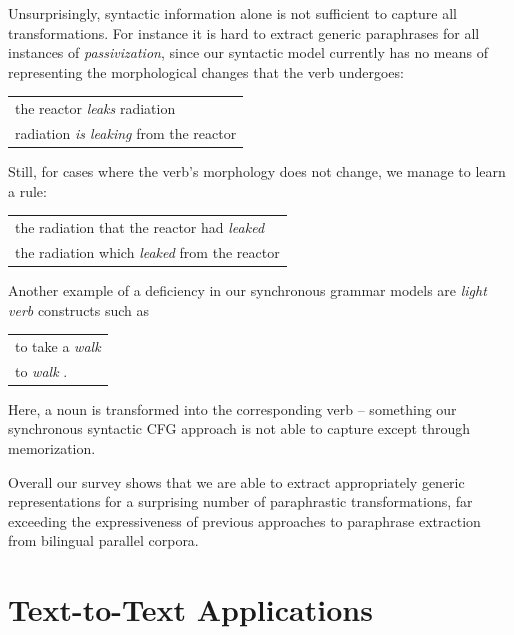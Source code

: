 \documentclass[11pt]{article}
\begin{document}
Unsurprisingly, syntactic information alone is not sufficient to
capture all transformations. For instance it is hard to extract
generic paraphrases for all instances of \emph{passivization}, since
our syntactic model currently has no means of representing the
morphological changes that the verb undergoes:
\begin{center}
\begin{tabular}{l}
  the reactor \emph{leaks} radiation \\
  radiation \emph{is leaking} from the reactor\\
\end{tabular}
\end{center}
Still, for cases where the verb's morphology does not change, we
manage to learn a rule:
\begin{center}
\begin{tabular}{l}
  the radiation that the reactor had \emph{leaked} \\
  the radiation which \emph{leaked} from the reactor \\
\end{tabular}
\end{center}
Another example of a deficiency in our synchronous grammar models are
\emph{light verb} constructs such as
\begin{center}
\begin{tabular}{l}
  to take a \emph{walk} \\
  to \emph{walk} .
\end{tabular}
\end{center}
Here, a noun is transformed into the corresponding verb -- something
our synchronous syntactic CFG approach is not able to capture except
through memorization.

Overall our survey shows that we are able to extract appropriately
generic representations for a surprising number of paraphrastic
transformations, far exceeding the expressiveness of previous
approaches to paraphrase extraction from bilingual parallel corpora.


\section{Text-to-Text Applications} \label{adaptation}
\end{document}
